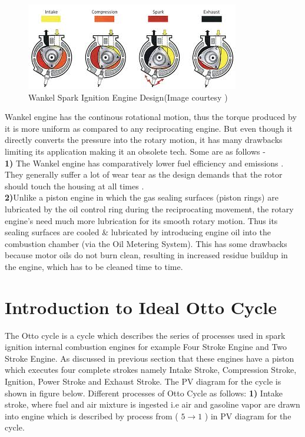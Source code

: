 \documentclass[11pt]{article}
\begin{document}
\begin{figure}[h]
  \includegraphics[width=\linewidth,scale=0.75]{wankel.jpg}
  \caption{Wankel Spark Ignition Engine Design(Image courtesy \cite{ref7})}
  \label{fig:Wankel Spark Ignition Engine Design}
\end{figure}
Wankel engine has the continous rotational motion, thus the torque produced by it is more uniform as compared to any reciprocating engine. But even though it directly converts the pressure into the rotary motion, it has many drawbacks limiting its application making it an obsolete tech. Some are as follows - \\
\textbf{1)}
The Wankel engine has comparatively lower fuel efficiency and emissions \cite{ref8}. They generally suffer a lot of wear tear as the design demands that the rotor should touch the housing at all times \cite{ref7}. \\
\textbf{2)}Unlike a piston engine in which the gas sealing surfaces (piston rings) are lubricated by the oil control ring during the reciprocating movement, the rotary engine’s need much more lubrication for its smooth rotary motion. Thus its sealing surfaces are cooled \& lubricated by introducing engine oil into the combustion chamber (via the Oil Metering System). This has some drawbacks because motor oils do not burn clean, resulting in increased residue buildup in the engine, which has to be cleaned time to time.

\section{Introduction to Ideal Otto Cycle}
The Otto cycle is a cycle which describes the series of processes used in spark ignition internal combustion engines for example Four Stroke Engine and Two Stroke Engine. As discussed in previous section that these engines have a piston which executes four complete strokes namely Intake Stroke, Compression Stroke, Ignition, Power Stroke and Exhaust Stroke. The PV diagram for the cycle \cite{ref14} is shown in figure below. Different processes of Otto Cycle as follows: 
\newline
\textbf{1)} Intake stroke, where fuel and air mixture is ingested i.e  air and gasoline vapor are drawn into engine which is described by process from ( $ 5 \rightarrow 1$ ) in PV diagram for the cycle.
\end{document}
